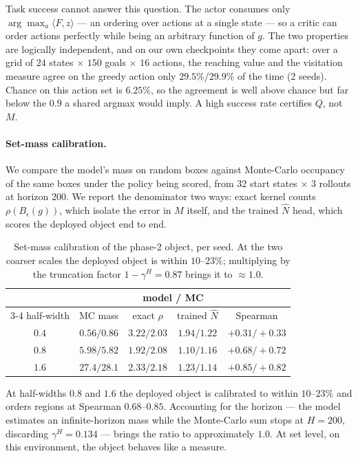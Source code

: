 Task success cannot answer this question. The actor consumes only
$\arg\max_a\langle F,z\rangle$ --- an ordering over actions at a single state ---
so a critic can order actions perfectly while being an arbitrary function of $g$.
The two properties are logically independent, and on our own checkpoints they come
apart: over a grid of $24$ states $\times$ $150$ goals $\times$ $16$ actions, the
reaching value and the visitation measure agree on the greedy action only
$29.5\%$/$29.9\%$ of the time (2 seeds). Chance on this action set is $6.25\%$, so
the agreement is well above chance but far below the $0.9$ a shared argmax would
imply. A high success rate certifies $Q$, not $M$.

\paragraph{Set-mass calibration.}
We compare the model's mass on random boxes against Monte-Carlo occupancy of the
same boxes under the policy being scored, from $32$ start states $\times$ $3$
rollouts at horizon $200$. We report the denominator two ways: exact kernel counts
$\rho(B_\epsilon(g))$, which isolate the error in $M$ itself, and the trained
$\hat N$ head, which scores the deployed object end to end.

\begin{table}[t]
\centering\footnotesize
\begin{tabular}{c c c c c}
\toprule
& & \multicolumn{2}{c}{model / MC} & \\
\cmidrule(lr){3-4}
half-width & MC mass & exact $\rho$ & trained $\hat N$ & Spearman \\
\midrule
$0.4$ & $0.56/0.86$ & $3.22/2.03$ & $1.94/1.22$ & $+0.31/+0.33$ \\
$0.8$ & $5.98/5.82$ & $1.92/2.08$ & $\mathbf{1.10/1.16}$ & $+0.68/+0.72$ \\
$1.6$ & $27.4/28.1$ & $2.33/2.18$ & $\mathbf{1.23/1.14}$ & $+0.85/+0.82$ \\
\bottomrule
\end{tabular}
\caption{Set-mass calibration of the phase-2 object, per seed. At the two coarser
scales the deployed object is within $10$--$23\%$; multiplying by the truncation
factor $1-\gamma^{H}=0.87$ brings it to ${\approx}1.0$.}
\label{tab:calib}
\end{table}

At half-widths $0.8$ and $1.6$ the deployed object is calibrated to within
$10$--$23\%$ and orders regions at Spearman $0.68$--$0.85$. Accounting for the
horizon --- the model estimates an infinite-horizon mass while the Monte-Carlo sum
stops at $H{=}200$, discarding $\gamma^{H}=0.134$ --- brings the ratio to
approximately $1.0$. At set level, on this environment, the object behaves like a
measure.

